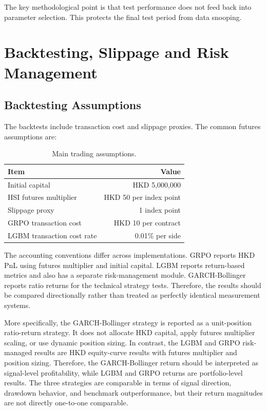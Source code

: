 \documentclass[11pt,a4paper]{article}
\begin{document}
The key methodological point is that test performance does not feed back into parameter selection. This protects the final test period from data snooping.

\section{Backtesting, Slippage and Risk Management}

\subsection{Backtesting Assumptions}

The backtests include transaction cost and slippage proxies. The common futures assumptions are:

\begin{table}[H]
    \centering
    \caption{Main trading assumptions.}
    \label{tab:trading-assumptions}
    \begin{tabular}{lr}
        \toprule
        Item & Value \\
        \midrule
        Initial capital & HKD 5,000,000 \\
        HSI futures multiplier & HKD 50 per index point \\
        Slippage proxy & 1 index point \\
        GRPO transaction cost & HKD 10 per contract \\
        LGBM transaction cost rate & 0.01\% per side \\
        \bottomrule
    \end{tabular}
\end{table}

The accounting conventions differ across implementations. GRPO reports HKD PnL using futures multiplier and initial capital. LGBM reports return-based metrics and also has a separate risk-management module. GARCH-Bollinger reports ratio returns for the technical strategy tests. Therefore, the results should be compared directionally rather than treated as perfectly identical measurement systems.

More specifically, the GARCH-Bollinger strategy is reported as a unit-position ratio-return strategy. It does not allocate HKD capital, apply futures multiplier scaling, or use dynamic position sizing. In contrast, the LGBM and GRPO risk-managed results are HKD equity-curve results with futures multiplier and position sizing. Therefore, the GARCH-Bollinger return should be interpreted as signal-level profitability, while LGBM and GRPO returns are portfolio-level results. The three strategies are comparable in terms of signal direction, drawdown behavior, and benchmark outperformance, but their return magnitudes are not directly one-to-one comparable.
\end{document}
